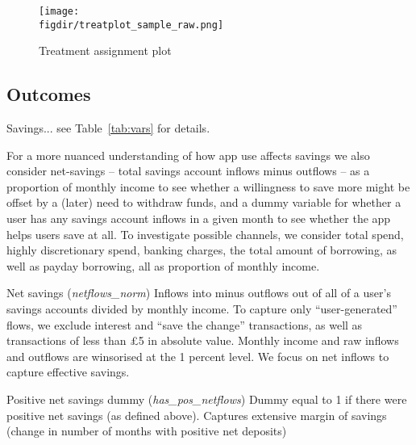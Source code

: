 \begin{figure}[H]
    \centering
    \caption{Treatment assignment plot}%
    \texttt{[image: \\figdir/treatplot\_sample\_raw.png]}
    \label{fig:treatplot_sample_raw}


\end{figure}


\subsection{Outcomes}%
\label{sub:outcomes}

Savings... see Table~\ref{tab:vars} for details.

For a more nuanced understanding of how app use affects savings we also
consider net-savings -- total savings account inflows minus outflows -- as a
proportion of monthly income to see whether a willingness to save more might be
offset by a (later) need to withdraw funds, and a dummy variable for whether a
user has any savings account inflows in a given month to see whether the app
helps users save at all. To investigate possible channels, we consider total
spend, highly discretionary spend, banking charges, the total amount of
borrowing, as well as payday borrowing, all as proportion of monthly income.



Net savings (\textit{netflows\_norm})
Inflows into minus outflows out of all of a user's savings accounts divided
by monthly income. To capture only ``user-generated'' flows, we exclude
interest and ``save the change'' transactions, as well as transactions of
less than \pounds5 in absolute
value. Monthly income and raw inflows and outflows are winsorised at the 1
percent level.
We focus on net inflows to capture effective savings.

Positive net savings dummy (\textit{has\_pos\_netflows})
Dummy equal to 1 if there were positive net savings (as defined above).
Captures extensive margin of savings (change in number of months with positive
net deposits)

